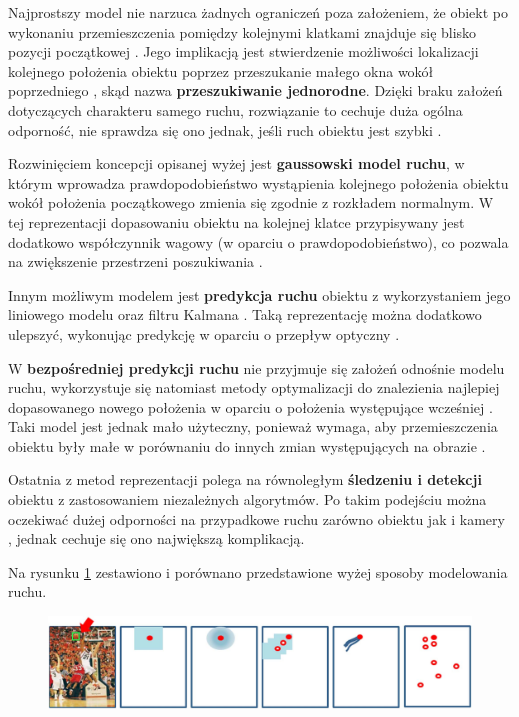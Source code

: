 Najprostszy model nie narzuca żadnych ograniczeń poza założeniem, że obiekt po wykonaniu przemieszczenia pomiędzy kolejnymi klatkami znajduje się blisko pozycji początkowej \cite{Smeulders2010}. Jego implikacją jest stwierdzenie możliwości lokalizacji kolejnego położenia obiektu poprzez przeszukanie małego okna wokół poprzedniego \cite{Smeulders2010}, skąd nazwa \textbf{przeszukiwanie jednorodne}. Dzięki braku założeń dotyczących charakteru samego ruchu, rozwiązanie to cechuje duża ogólna odporność, nie sprawdza się ono jednak, jeśli ruch obiektu jest szybki \cite{Smeulders2010}.

Rozwinięciem koncepcji opisanej wyżej jest \textbf{gaussowski model ruchu}, w którym wprowadza prawdopodobieństwo wystąpienia kolejnego położenia obiektu wokół położenia początkowego zmienia się zgodnie z rozkładem normalnym. W tej reprezentacji dopasowaniu obiektu na kolejnej klatce przypisywany jest dodatkowo współczynnik wagowy (w oparciu o prawdopodobieństwo), co pozwala na zwiększenie przestrzeni poszukiwania \cite{Smeulders2010}.

Innym możliwym modelem jest \textbf{predykcja ruchu} obiektu z wykorzystaniem jego liniowego modelu oraz filtru Kalmana \cite{Smeulders2010}. Taką reprezentację można dodatkowo ulepszyć, wykonując predykcję w oparciu o przepływ optyczny \cite{Smeulders2010}.

W \textbf{bezpośredniej predykcji ruchu} nie przyjmuje się założeń odnośnie modelu ruchu, wykorzystuje się natomiast metody optymalizacji do znalezienia najlepiej dopasowanego nowego położenia w oparciu o położenia występujące wcześniej \cite{Smeulders2010}. Taki model jest jednak mało użyteczny, ponieważ wymaga, aby przemieszczenia obiektu były małe w porównaniu do innych zmian występujących na obrazie \cite{Smeulders2010}.

Ostatnia z metod reprezentacji polega na równoległym \textbf{śledzeniu i detekcji} obiektu z zastosowaniem niezależnych algorytmów. Po takim podejściu można oczekiwać dużej odporności na przypadkowe ruchu zarówno obiektu jak i kamery \cite{Smeulders2010}, jednak cechuje się ono największą komplikacją.

Na rysunku \ref{fig:Modele_ruchu_obiektu} zestawiono i porównano przedstawione wyżej sposoby modelowania ruchu. 

\begin{figure}[!htb]
	\begin{center}
		\includegraphics[width=12cm]{images/target_motion_representation.png}
	\end{center}	
\label{fig:Modele_ruchu_obiektu}
\end{figure}

